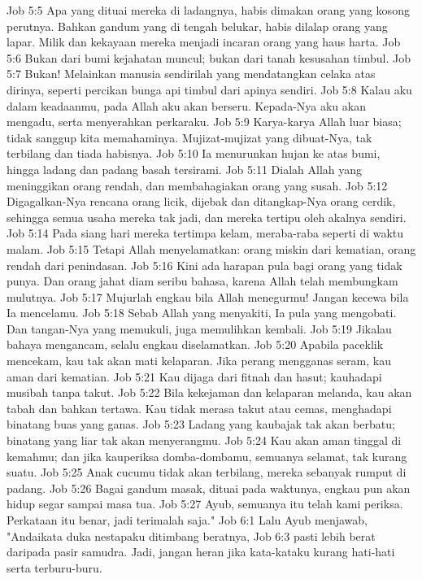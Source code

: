 Job 5:5  Apa yang dituai mereka di ladangnya, habis dimakan orang yang kosong perutnya. Bahkan gandum yang di tengah belukar, habis dilalap orang yang lapar. Milik dan kekayaan mereka menjadi incaran orang yang haus harta.
Job 5:6  Bukan dari bumi kejahatan muncul; bukan dari tanah kesusahan timbul.
Job 5:7  Bukan! Melainkan manusia sendirilah yang mendatangkan celaka atas dirinya, seperti percikan bunga api timbul dari apinya sendiri.
Job 5:8  Kalau aku dalam keadaanmu, pada Allah aku akan berseru. Kepada-Nya aku akan mengadu, serta menyerahkan perkaraku.
Job 5:9  Karya-karya Allah luar biasa; tidak sanggup kita memahaminya. Mujizat-mujizat yang dibuat-Nya, tak terbilang dan tiada habisnya.
Job 5:10  Ia menurunkan hujan ke atas bumi, hingga ladang dan padang basah tersirami.
Job 5:11  Dialah Allah yang meninggikan orang rendah, dan membahagiakan orang yang susah.
Job 5:12  Digagalkan-Nya rencana orang licik, dijebak dan ditangkap-Nya orang cerdik, sehingga semua usaha mereka tak jadi, dan mereka tertipu oleh akalnya sendiri.
Job 5:14  Pada siang hari mereka tertimpa kelam, meraba-raba seperti di waktu malam.
Job 5:15  Tetapi Allah menyelamatkan: orang miskin dari kematian, orang rendah dari penindasan.
Job 5:16  Kini ada harapan pula bagi orang yang tidak punya. Dan orang jahat diam seribu bahasa, karena Allah telah membungkam mulutnya.
Job 5:17  Mujurlah engkau bila Allah menegurmu! Jangan kecewa bila Ia mencelamu.
Job 5:18  Sebab Allah yang menyakiti, Ia pula yang mengobati. Dan tangan-Nya yang memukuli, juga memulihkan kembali.
Job 5:19  Jikalau bahaya mengancam, selalu engkau diselamatkan.
Job 5:20  Apabila paceklik mencekam, kau tak akan mati kelaparan. Jika perang mengganas seram, kau aman dari kematian.
Job 5:21  Kau dijaga dari fitnah dan hasut; kauhadapi musibah tanpa takut.
Job 5:22  Bila kekejaman dan kelaparan melanda, kau akan tabah dan bahkan tertawa. Kau tidak merasa takut atau cemas, menghadapi binatang buas yang ganas.
Job 5:23  Ladang yang kaubajak tak akan berbatu; binatang yang liar tak akan menyerangmu.
Job 5:24  Kau akan aman tinggal di kemahmu; dan jika kauperiksa domba-dombamu, semuanya selamat, tak kurang suatu.
Job 5:25  Anak cucumu tidak akan terbilang, mereka sebanyak rumput di padang.
Job 5:26  Bagai gandum masak, dituai pada waktunya, engkau pun akan hidup segar sampai masa tua.
Job 5:27  Ayub, semuanya itu telah kami periksa. Perkataan itu benar, jadi terimalah saja."
Job 6:1  Lalu Ayub menjawab, "Andaikata duka nestapaku ditimbang beratnya,
Job 6:3  pasti lebih berat daripada pasir samudra. Jadi, jangan heran jika kata-kataku kurang hati-hati serta terburu-buru.
